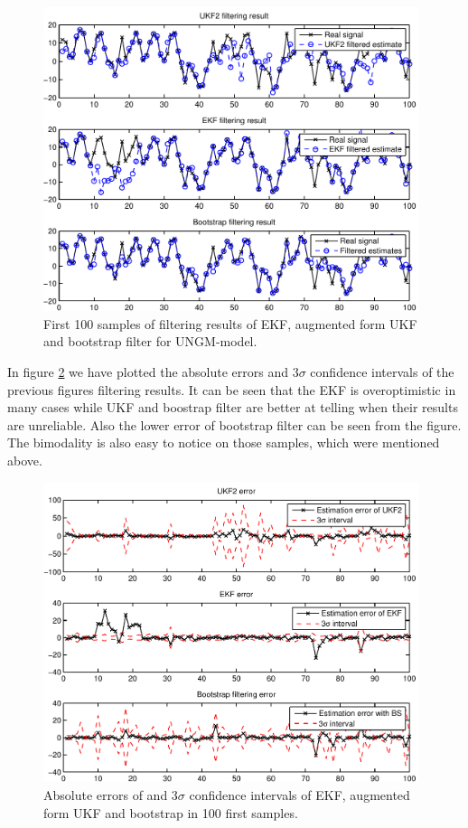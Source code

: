\begin{figure}
\begin{center}
\includegraphics[width=11cm]{pics/ungm_states}
\caption{First 100 samples of filtering results of EKF, augmented form
UKF and bootstrap filter for UNGM-model.}
\label{fig:ungm_states}
\end{center}
\end{figure}

In figure \ref{fig:ungm_c_errors} we have plotted the absolute errors
and $3\sigma$ confidence intervals of the previous figures filtering
results. It can be seen that the EKF is overoptimistic in many cases
while UKF and boostrap filter are better at telling when their results
are unreliable. Also the lower error of bootstrap filter can be seen
from the figure. The bimodality is also easy to notice on those
samples, which were mentioned above.

\begin{figure}
\begin{center}
\includegraphics[width=11cm]{pics/ungm_c_errors}
\caption{Absolute errors of and $3\sigma$ confidence intervals of EKF,
augmented form UKF and bootstrap in 100 first samples.}
\label{fig:ungm_c_errors}
\end{center}
\end{figure}

